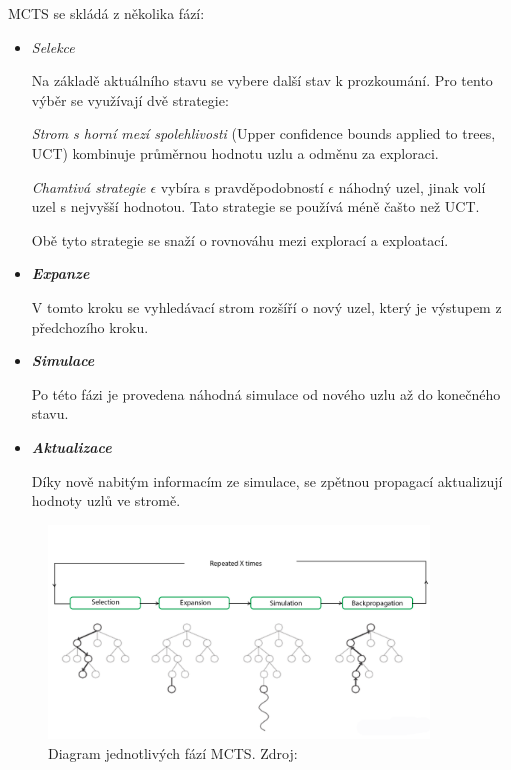 MCTS se skládá z několika fází:
\begin{itemize}
  \item \emph{Selekce}

  Na základě aktuálního stavu se vybere další stav k prozkoumání.
  Pro tento výběr se využívají dvě strategie:
  
  \emph{Strom s horní mezí spolehlivosti} (Upper confidence bounds applied to trees, UCT) kombinuje průměrnou hodnotu uzlu a odměnu za exploraci.


  \emph{Chamtivá strategie $\epsilon$ } vybíra s pravděpodobností $\epsilon$ náhodný uzel, jinak volí uzel s nejvyšší hodnotou.
  Tato strategie se používá méně čašto než UCT.

  Obě tyto strategie se snaží o rovnováhu mezi explorací a exploatací.
  \item \textbf{\emph{Expanze}}

  V tomto kroku se vyhledávací strom rozšíří o nový uzel, který je výstupem z předchozího kroku.

  \item \textbf{\emph{Simulace}}

  Po této fázi je provedena náhodná simulace od nového uzlu až do konečného stavu.

  \item \textbf{\emph{Aktualizace}}
  
  Díky nově nabitým informacím ze simulace, se zpětnou propagací aktualizují hodnoty uzlů ve stromě.

\end{itemize}

\begin{figure}[hbt]
	\centering
	\includegraphics[width=0.9\textwidth]{obrazky-figures/mcts.png}
	\caption{Diagram jednotlivých fází MCTS.
  Zdroj:\cite{Monte_Carlo_Tree_Search}}
\end{figure}

